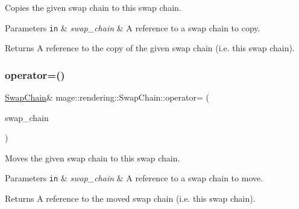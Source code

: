Copies the given swap chain to this swap chain.


\begin{DoxyParams}[1]{Parameters}
\mbox{\tt in}  & {\em swap\+\_\+chain} & A reference to a swap chain to copy. \\
\hline
\end{DoxyParams}
\begin{DoxyReturn}{Returns}
A reference to the copy of the given swap chain (i.\+e. this swap chain). 
\end{DoxyReturn}
\mbox{\label{classmage_1_1rendering_1_1_swap_chain_a815e4c6a4dfa149c4c3218f274c1850b}} 
\subsubsection{\texorpdfstring{operator=()}{operator=()}\hspace{0.1cm}{\footnotesize\ttfamily [2/2]}}
{\footnotesize\ttfamily \mbox{\hyperlink{classmage_1_1rendering_1_1_swap_chain}{Swap\+Chain}}\& mage\+::rendering\+::\+Swap\+Chain\+::operator= (\begin{DoxyParamCaption}\item[{\mbox{\hyperlink{classmage_1_1rendering_1_1_swap_chain}{Swap\+Chain}} \&\&}]{swap\+\_\+chain }\end{DoxyParamCaption})\hspace{0.3cm}{\ttfamily [delete]}}

Moves the given swap chain to this swap chain.


\begin{DoxyParams}[1]{Parameters}
\mbox{\tt in}  & {\em swap\+\_\+chain} & A reference to a swap chain to move. \\
\hline
\end{DoxyParams}
\begin{DoxyReturn}{Returns}
A reference to the moved swap chain (i.\+e. this swap chain). 
\end{DoxyReturn}
\mbox{\label{classmage_1_1rendering_1_1_swap_chain_a6739d35cf37b6d50adc70eb09cba2446}} 
